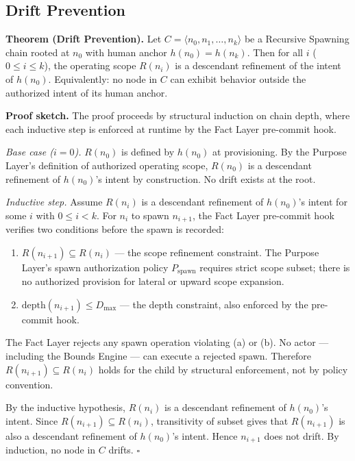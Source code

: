 \subsection{Drift Prevention}
\label{sec:rs-drift-prevention}

\medskip
\noindent\textbf{Theorem (Drift Prevention).} Let $C = \langle n_0, n_1, \ldots, n_k \rangle$ be a Recursive Spawning chain rooted at $n_0$ with human anchor $h(n_0) = h(n_k)$. Then for all $i$ ($0 \leq i \leq k$), the operating scope $R(n_i)$ is a descendant refinement of the intent of $h(n_0)$. Equivalently: no node in $C$ can exhibit behavior outside the authorized intent of its human anchor.

\medskip
\noindent\textbf{Proof sketch.} The proof proceeds by structural induction on chain depth, where each inductive step is enforced at runtime by the Fact Layer pre-commit hook.

\medskip
\textit{Base case ($i=0$).} $R(n_0)$ is defined by $h(n_0)$ at provisioning. By the Purpose Layer's definition of authorized operating scope, $R(n_0)$ is a descendant refinement of $h(n_0)$'s intent by construction. No drift exists at the root.

\medskip
\textit{Inductive step.} Assume $R(n_i)$ is a descendant refinement of $h(n_0)$'s intent for some $i$ with $0 \leq i < k$. For $n_i$ to spawn $n_{i+1}$, the Fact Layer pre-commit hook verifies two conditions before the spawn is recorded:

\begin{enumerate}
    \item[(a)] $R(n_{i+1}) \subseteq R(n_i)$ --- the scope refinement constraint. The Purpose Layer's spawn authorization policy $P_{\mathrm{spawn}}$ requires strict scope subset; there is no authorized provision for lateral or upward scope expansion.
    \item[(b)] $\mathrm{depth}(n_{i+1}) \leq D_{\mathrm{max}}$ --- the depth constraint, also enforced by the pre-commit hook.
\end{enumerate}

The Fact Layer rejects any spawn operation violating (a) or (b). No actor --- including the Bounds Engine --- can execute a rejected spawn. Therefore $R(n_{i+1}) \subseteq R(n_i)$ holds for the child by structural enforcement, not by policy convention.

By the inductive hypothesis, $R(n_i)$ is a descendant refinement of $h(n_0)$'s intent. Since $R(n_{i+1}) \subseteq R(n_i)$, transitivity of subset gives that $R(n_{i+1})$ is also a descendant refinement of $h(n_0)$'s intent. Hence $n_{i+1}$ does not drift. By induction, no node in $C$ drifts. $\square$

